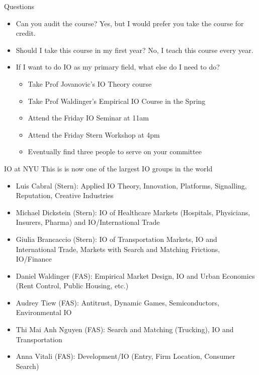 \begin{frame}{Questions}
\begin{itemize}
    \item Can you audit the course? Yes, but I would prefer you take the course for credit.
    \item Should I take this course in my first year? No, I teach this course every year.
    \item If I want to do IO as my primary field, what else do I need to do?
    \begin{itemize}
        \item Take Prof Jovanovic's IO Theory course
        \item Take Prof Waldinger's Empirical IO Course in the Spring
        \item Attend the Friday IO Seminar at 11am
        \item Attend the Friday Stern Workshop at 4pm
        \item Eventually find three people to serve on your committee
    \end{itemize}
\end{itemize}
\end{frame}



\begin{frame}{IO at NYU}
This is is now one of the largest IO groups in the world
\begin{itemize}
    \item Luis Cabral (Stern): Applied IO Theory, Innovation, Platforms, Signalling, Reputation, Creative Industries
    \item Michael Dickstein (Stern): IO of Healthcare Markets (Hospitals, Physicians, Insurers, Pharma) and IO/International Trade
    \item Giulia Brancaccio (Stern): IO of Transportation Markets, IO and International Trade, Markets with Search and Matching Frictions, IO/Finance
    \item Daniel Waldinger (FAS): Empirical Market Design, IO and Urban Economics (Rent Control, Public Housing, etc.)
    \item Audrey Tiew (FAS): Antitrust, Dynamic Games, Semiconductors, Environmental IO
    \item Thi Mai Anh Nguyen (FAS): Search and Matching (Trucking), IO and Transportation
    \item Anna Vitali (FAS): Development/IO (Entry, Firm Location, Consumer Search)
\end{itemize}
\end{frame}

